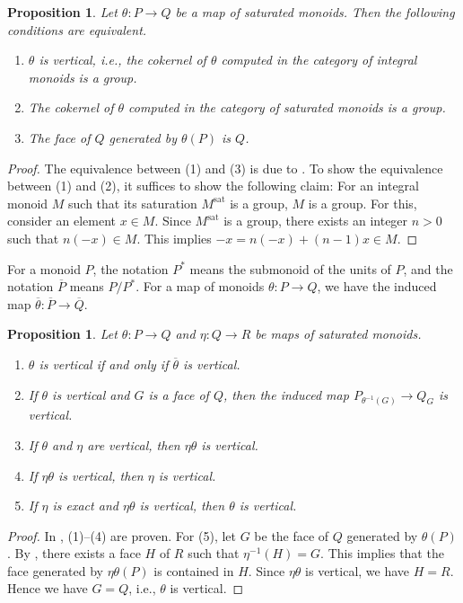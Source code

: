 \documentclass[10pt]{amsart}
\newtheorem{prop}[thm]{Proposition}
\theoremstyle{definition}
\theoremstyle{remark}
\numberwithin{equation}{subsection}
\newcommand{\ol}{\overline}
\begin{document}
\begin{prop}
\label{vert.4}
Let $\theta\colon P\to Q$ be a map of saturated monoids.
Then the following conditions are equivalent.
\begin{enumerate}
\item[\textup{(1)}]
$\theta$ is vertical,
i.e.,
the cokernel of $\theta$ computed in the category of integral monoids is a group.
\item[\textup{(2)}]
The cokernel of $\theta$ computed in the category of saturated monoids is a group.
\item[\textup{(3)}]
The face of $Q$ generated by $\theta(P)$ is $Q$.
\end{enumerate}
\end{prop}
\begin{proof}
The equivalence between (1) and (3) is due to \cite[Remark I.4.3.2]{Ogu}.
To show the equivalence between (1) and (2),
it suffices to show the following claim:
For an integral monoid $M$ such that its saturation $M^\mathrm{sat}$ is a group,
$M$ is a group.
For this,
consider an element $x\in M$.
Since $M^\mathrm{sat}$ is a group,
there exists an integer $n>0$ such that $n(-x)\in M$.
This implies $-x=n(-x)+(n-1)x\in M$.
\end{proof}

For a monoid $P$, the notation $P^*$ means the submonoid of the units of $P$,
and the notation $\ol{P}$ means $P/P^*$.
For a map of monoids $\theta\colon P\to Q$,
we have the induced map $\ol{\theta}\colon \ol{P}\to \ol{Q}$.

\begin{prop}
\label{vert.3}
Let $\theta\colon P\to Q$ and $\eta\colon Q\to R$ be maps of saturated monoids.
\begin{enumerate}
\item[{\rm (1)}]
$\theta$ is vertical if and only if $\overline{\theta}$ is vertical.
\item[{\rm (2)}]
If $\theta$ is vertical and $G$ is a face of $Q$, then the induced map $P_{\theta^{-1}(G)}\to Q_G$ is vertical.
\item[{\rm (3)}]
If $\theta$ and $\eta$ are vertical, then $\eta\theta$ is vertical.
\item[{\rm (4)}]
If $\eta\theta$ is vertical, then $\eta$ is vertical.
\item[{\rm (5)}]
If $\eta$ is exact and $\eta\theta$ is vertical, then $\theta$ is vertical.
\end{enumerate}
\end{prop}
\begin{proof}
In \cite[Proposition I.4.3.3]{Ogu}, (1)--(4) are proven.
For (5), let $G$ be the face of $Q$ generated by $\theta(P)$.
By \cite[Proposition I.4.2.2]{Ogu}, there exists a face $H$ of $R$ such that $\eta^{-1}(H)=G$.
This implies that the face generated by $\eta\theta(P)$ is contained in $H$.
Since $\eta\theta$ is vertical, we have $H=R$.
Hence we have $G=Q$, i.e., $\theta$ is vertical.
\end{proof}
\end{document}
